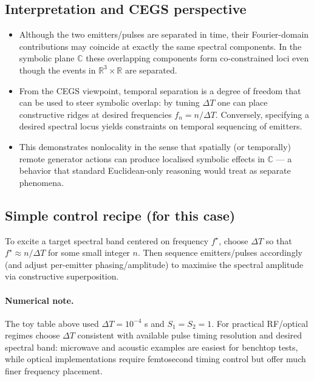 \documentclass[11pt]{article}
\theoremstyle{plain}
\theoremstyle{definition}
\theoremstyle{remark}
\begin{document}
\subsection*{Interpretation and CEGS perspective}
\begin{itemize}[leftmargin=*]
  \item Although the two emitters/pulses are separated in time, their Fourier-domain
        contributions may coincide at exactly the same spectral components. In the
        symbolic plane \(\mathbb{C}\) these overlapping components form co-constrained
        loci even though the events in \(\mathbb{R}^3\times\mathbb{R}\) are separated.
  \item From the CEGS viewpoint, temporal separation is a degree of freedom that can
        be used to steer symbolic overlap: by tuning \(\Delta T\) one can place
        constructive ridges at desired frequencies \(f_n = n/\Delta T\). Conversely,
        specifying a desired spectral locus yields constraints on temporal sequencing
        of emitters.
  \item This demonstrates nonlocality in the sense that spatially (or temporally)
        remote generator actions can produce localised symbolic effects in \(\mathbb{C}\)
        — a behavior that standard Euclidean-only reasoning would treat as separate phenomena.
\end{itemize}

\subsection*{Simple control recipe (for this case)}
To excite a target spectral band centered on frequency \(f^\star\), choose \(\Delta T\) so that
\(f^\star\approx n/\Delta T\) for some small integer \(n\). Then sequence emitters/pulses
accordingly (and adjust per-emitter phasing/amplitude) to maximise the spectral amplitude
via constructive superposition.

\paragraph{Numerical note.} The toy table above used \(\Delta T=10^{-4}\) s and
\(S_1=S_2=1\). For practical RF/optical regimes choose \(\Delta T\) consistent with
available pulse timing resolution and desired spectral band: microwave and acoustic
examples are easiest for benchtop tests, while optical implementations require
femtosecond timing control but offer much finer frequency placement.
\end{document}

